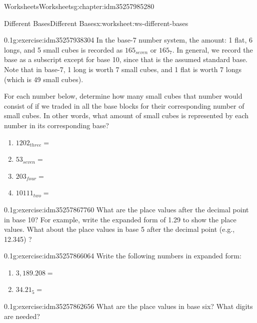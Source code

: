 \documentclass[twoside,11pt,]{book}
\begin{document}
\begin{chapterptx}{Worksheets}{}{Worksheets}{}{}{g:chapter:idm35257985280}
\restoregeometry
%
%
\typeout{************************************************}
\typeout{************************************************}
%
\begin{worksheet-section-numberless}{Different Bases}{}{Different Bases}{}{}{x:worksheet:ws-different-bases}
\begin{divisionexercise}{1}{}{0.1}{g:exercise:idm35257938304}%
In the base-7 number system, the amount: 1 flat, 6 longs, and 5 small cubes is recorded as \(165_{seven}\) or \(165_7\). In general, we record the base as a subscript except for base 10, since that is the assumed standard base.  Note that in base-7, 1 long is worth 7 small cubes, and 1 flat is worth 7 longs (which is 49 small cubes).%
\par
For each number below, determine how many small cubes that number would consist of if we traded in all the base blocks for their corresponding number of small cubes.  In other words, what amount of small cubes is represented by each number in its corresponding base?%
%
\begin{enumerate}[label=(\alph*)]
\item{}\(1202_{three}   = \)%
\item{}\(53_{seven}       = \)%
\item{}\(203_{four}       = \)%
\item{}\(10111_{two}       = \)%
\end{enumerate}
\end{divisionexercise}%
\begin{divisionexercise}{2}{}{0.1}{g:exercise:idm35257867760}%
What are the place values after the decimal point in base 10? For example, write the expanded form of 1.29 to show the place values. What about the place values in base 5 after the decimal point (e.g., 12.345) ?%
\end{divisionexercise}%
\begin{divisionexercise}{3}{}{0.1}{g:exercise:idm35257866064}%
Write the following numbers in expanded form:%
%
\begin{enumerate}[label=(\alph*)]
\item{}\(3,189.208 = \)%
\item{}\(34.21_5      = \)%
\end{enumerate}
\end{divisionexercise}%
\begin{divisionexercise}{4}{}{0.1}{g:exercise:idm35257862656}%
What are the place values in base six?  What digits are needed?%

\end{divisionexercise}
\end{worksheet-section-numberless}
\end{chapterptx}
\end{document}
